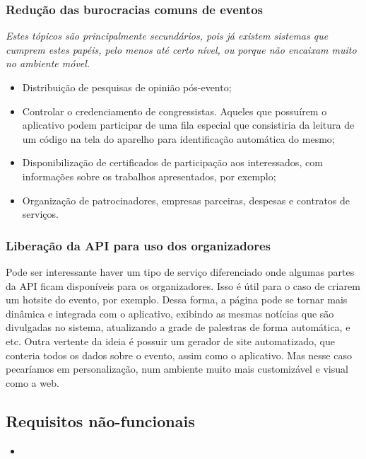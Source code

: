 \documentclass[12pt,a4paper,twoside,hyphens,english,brazil]{abntex2}
\begin{document}
\subsubsection*{Redução das burocracias comuns de eventos}
\emph{Estes tópicos são principalmente secundários, pois já existem sistemas que cumprem estes papéis, pelo menos até certo nível, ou porque não encaixam muito no ambiente móvel.}
\begin{itemize}[itemsep=-0.5ex]
	\item Distribuição de pesquisas de opinião pós-evento;
	\item Controlar o credenciamento de congressistas. Aqueles que possuírem o aplicativo podem participar de uma fila especial que consistiria da leitura de um código na tela do aparelho para identificação automática do mesmo;
	\item Disponibilização de certificados de participação aos interessados, com informações sobre os trabalhos apresentados, por exemplo;
	\item Organização de patrocinadores, empresas parceiras, despesas e contratos de serviços.
\end{itemize}

\subsubsection*{Liberação da API para uso dos organizadores}
Pode ser interessante haver um tipo de serviço diferenciado onde algumas partes da API ficam disponíveis para os organizadores. Isso é útil para o caso de criarem um hotsite do evento, por exemplo. Dessa forma, a página pode se tornar mais dinâmica e integrada com o aplicativo, exibindo as mesmas notícias que são divulgadas no sistema, atualizando a grade de palestras de forma automática, e etc.
Outra vertente da ideia é possuir um gerador de site automatizado, que conteria todos os dados sobre o evento, assim como o aplicativo. Mas nesse caso pecaríamos em personalização, num ambiente muito mais customizável e visual como a web.

\subsection{Requisitos não-funcionais} %
\begin{itemize}
	\item 
\end{itemize}

\end{document}

